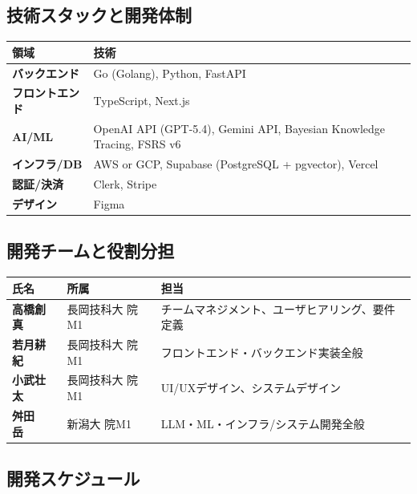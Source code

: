 \documentclass[paper=a4,fontsize=10.5bp,jafontsize=10.5bp]{jlreq}
\begin{document}
\subsection{技術スタックと開発体制}


\begin{footnotesize}\noindent
\begin{tabularx}{\linewidth}{>{\bfseries}l X}
\toprule
領域 & 技術 \\
\midrule
バックエンド & Go (Golang), Python, FastAPI \\
フロントエンド & TypeScript, Next.js \\
AI/ML & OpenAI API (GPT-5.4), Gemini API, Bayesian Knowledge Tracing, FSRS v6 \\
インフラ/DB & AWS or GCP, Supabase (PostgreSQL + pgvector), Vercel \\
認証/決済 & Clerk, Stripe \\
デザイン & Figma \\
\bottomrule
\end{tabularx}
\end{footnotesize}

\subsection{開発チームと役割分担}


\begin{footnotesize}\noindent
\begin{tabularx}{\linewidth}{>{\bfseries}l l X}
\toprule
氏名 & 所属 & 担当 \\
\midrule
高橋創真 & 長岡技科大 院M1 & チームマネジメント、ユーザヒアリング、要件定義 \\
若月耕紀 & 長岡技科大 院M1 & フロントエンド・バックエンド実装全般 \\
小武壮太 & 長岡技科大 院M1 & UI/UXデザイン、システムデザイン \\
舛田　岳 & 新潟大 院M1 & LLM・ML・インフラ/システム開発全般 \\
\bottomrule
\end{tabularx}
\end{footnotesize}

\subsection{開発スケジュール}
\end{document}
